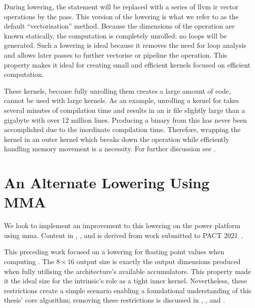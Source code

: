 \documentclass[\main/thesis.tex]{subfiles}
\begin{document}
During lowering, the  statement will be replaced with a series of \gls{llvm} \gls{ir} vector operations by the  pass.
This version of the lowering is what we refer to as the default ``vectorisation'' method.
Because the dimensions of the operation are known statically, the computation is completely unrolled: no loops will be generated.
Such a lowering is ideal because it removes the need for loop analysis and allows later passes to further vectorise or pipeline the operation.
This property makes it ideal for creating small and efficient kernels focused on efficient computation.

These kernels, because fully unrolling them creates a large amount of code, cannot be used with large kernels.
As an example, unrolling a kernel for  takes several minutes of compilation time and results in an \gls{ir} file slightly large than a gigabyte with over 12 million lines.
Producing a binary from this has never been accomplished due to the inordinate compilation time.
Therefore, wrapping the kernel in an outer kernel which breaks down the operation while efficiently handling memory movement is a necessity.
For further discussion see .

\section{An Alternate Lowering Using MMA}
We look to implement an improvement to this lowering on the \gls{power} platform using \gls{mma}.
Content in , , and  is derived from work submitted to PACT 2021~\autocite{kuzma2021fast}.

This preceding work focused on a lowering for floating point values when computing .
The $8 \times 16$ output size is exactly the output dimensions produced when fully utilising the architecture's available accumulators.
This property made it the ideal size for the intrinsic's role as a tight inner kernel.
Nevertheless, these restrictions create a simple scenario enabling a foundational understanding of this thesis' core algorithm; removing these restrictions is discussed in , , and .
\end{document}
